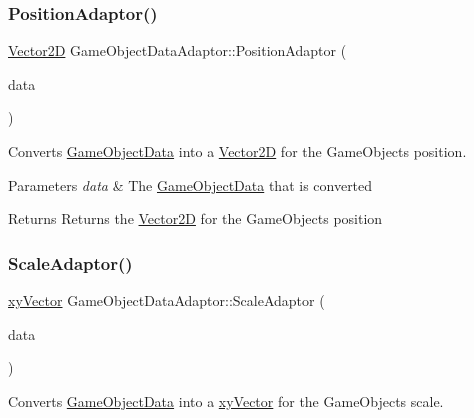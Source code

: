 \subsubsection{\texorpdfstring{Position\+Adaptor()}{PositionAdaptor()}}
{\footnotesize\ttfamily \hyperlink{class_vector2_d}{Vector2D} Game\+Object\+Data\+Adaptor\+::\+Position\+Adaptor (\begin{DoxyParamCaption}\item[{const \hyperlink{struct_game_object_data}{Game\+Object\+Data} \&}]{data }\end{DoxyParamCaption})\hspace{0.3cm}{\ttfamily [static]}}



Converts \hyperlink{struct_game_object_data}{Game\+Object\+Data} into a \hyperlink{class_vector2_d}{Vector2D} for the Game\+Objects position. 


\begin{DoxyParams}{Parameters}
{\em data} & The \hyperlink{struct_game_object_data}{Game\+Object\+Data} that is converted \\
\hline
\end{DoxyParams}
\begin{DoxyReturn}{Returns}
Returns the \hyperlink{class_vector2_d}{Vector2D} for the Game\+Objects position 
\end{DoxyReturn}
\mbox{\label{class_game_object_data_adaptor_aaaee19dcb6f182d26eb22f516760d67d}} 
\subsubsection{\texorpdfstring{Scale\+Adaptor()}{ScaleAdaptor()}}
{\footnotesize\ttfamily \hyperlink{structxy_vector}{xy\+Vector} Game\+Object\+Data\+Adaptor\+::\+Scale\+Adaptor (\begin{DoxyParamCaption}\item[{const \hyperlink{struct_game_object_data}{Game\+Object\+Data} \&}]{data }\end{DoxyParamCaption})\hspace{0.3cm}{\ttfamily [static]}}



Converts \hyperlink{struct_game_object_data}{Game\+Object\+Data} into a \hyperlink{structxy_vector}{xy\+Vector} for the Game\+Objects scale. 


